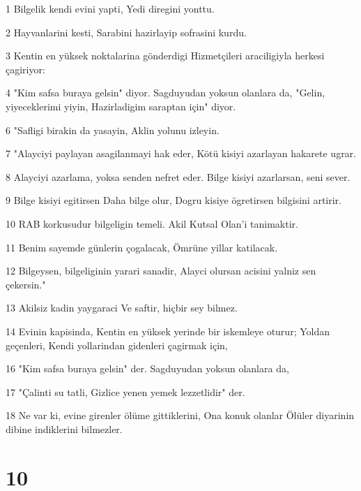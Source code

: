 \par 1 Bilgelik kendi evini yapti, Yedi diregini yonttu.
\par 2 Hayvanlarini kesti, Sarabini hazirlayip sofrasini kurdu.
\par 3 Kentin en yüksek noktalarina gönderdigi Hizmetçileri araciligiyla herkesi çagiriyor:
\par 4 "Kim safsa buraya gelsin" diyor. Sagduyudan yoksun olanlara da, "Gelin, yiyeceklerimi yiyin, Hazirladigim saraptan için" diyor.
\par 6 "Safligi birakin da yasayin, Aklin yolunu izleyin.
\par 7 "Alayciyi paylayan asagilanmayi hak eder, Kötü kisiyi azarlayan hakarete ugrar.
\par 8 Alayciyi azarlama, yoksa senden nefret eder. Bilge kisiyi azarlarsan, seni sever.
\par 9 Bilge kisiyi egitirsen Daha bilge olur, Dogru kisiye ögretirsen bilgisini artirir.
\par 10 RAB korkusudur bilgeligin temeli. Akil Kutsal Olan'i tanimaktir.
\par 11 Benim sayemde günlerin çogalacak, Ömrüne yillar katilacak.
\par 12 Bilgeysen, bilgeliginin yarari sanadir, Alayci olursan acisini yalniz sen çekersin."
\par 13 Akilsiz kadin yaygaraci Ve saftir, hiçbir sey bilmez.
\par 14 Evinin kapisinda, Kentin en yüksek yerinde bir iskemleye oturur; Yoldan geçenleri, Kendi yollarindan gidenleri çagirmak için,
\par 16 "Kim safsa buraya gelsin" der. Sagduyudan yoksun olanlara da,
\par 17 "Çalinti su tatli, Gizlice yenen yemek lezzetlidir" der.
\par 18 Ne var ki, evine girenler ölüme gittiklerini, Ona konuk olanlar Ölüler diyarinin dibine indiklerini bilmezler.

\chapter{10}

